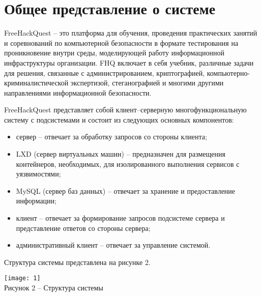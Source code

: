 \section{Общее представление о системе}

FreeHackQuest -- это платформа для обучения, проведения практических занятий и соревнований по компьютерной безопасности в формате тестирования на проникновение внутри среды, моделирующей работу информационной инфраструктуры организации. FHQ включает в себя учебник, различные задачи для решения, связанные с администрированием, криптографией, компьютерно-криминалистической экспертизой, стеганографией и многими другими направлениями информационной безопасности.\par
FreeHackQuest представляет собой клиент–серверную многофункциональную систему с подсистемами и состоит из следующих основных компонентов:
\begin{itemize}
\item сервер -- отвечает за обработку запросов со стороны клиента;
\item LXD (сервер виртуальных машин) -- предназначен для размещения контейнеров, необходимых, для изолированного выполнения сервисов с уязвимостями;
\item MySQL (сервер баз данных) -- отвечает за хранение и предоставление информации;
\item клиент -- отвечает за формирование запросов подсистеме сервера и представление ответов со стороны сервера;
\item административный клиент -- отвечает за управление системой.\par
\end{itemize}
\vspace{\baselineskip}

Структура системы представлена на рисунке 2.
\begin{center}
\texttt{[image: 1]}\\
Рисунок 2 -- Структура системы\\
\end{center}
\vspace{\baselineskip}

